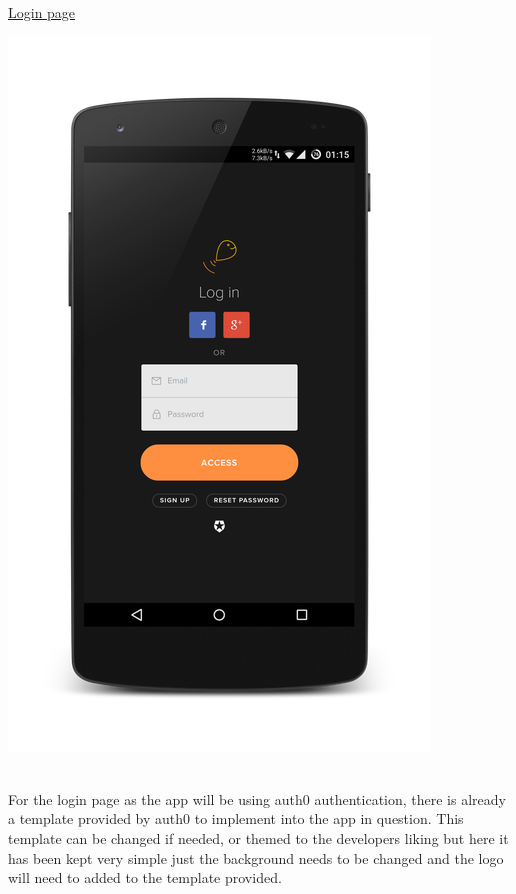 \newpage

\noindent\underline{Login page}\newline

\noindent
\begin{minipage}{\linewidth}
\centering
\includegraphics[scale=0.5]{./img/loginframed.png}
\label{fig:loginscreen}
\end{minipage}\\

For the login page as the app will be using auth0 authentication, there is already a template provided by auth0 to implement into the app in question. This template can be changed if needed, or themed to the developers liking but here it has been kept very simple just the background needs to be changed and the logo will need to added to the template provided.

